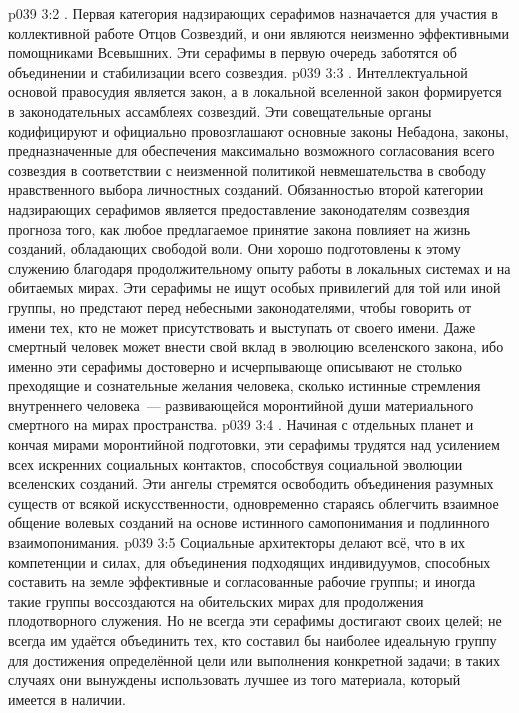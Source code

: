\vs p039 3:2 . Первая категория надзирающих серафимов назначается для участия в коллективной работе Отцов Созвездий, и они являются неизменно эффективными помощниками Всевышних. Эти серафимы в первую очередь заботятся об объединении и стабилизации всего созвездия.
\vs p039 3:3 . Интеллектуальной основой правосудия является закон, а в локальной вселенной закон формируется в законодательных ассамблеях созвездий. Эти совещательные органы кодифицируют и официально провозглашают основные законы Небадона, законы, предназначенные для обеспечения максимально возможного согласования всего созвездия в соответствии с неизменной политикой невмешательства в свободу нравственного выбора личностных созданий. Обязанностью второй категории надзирающих серафимов является предоставление законодателям созвездия прогноза того, как любое предлагаемое принятие закона повлияет на жизнь созданий, обладающих свободой воли. Они хорошо подготовлены к этому служению благодаря продолжительному опыту работы в локальных системах и на обитаемых мирах. Эти серафимы не ищут особых привилегий для той или иной группы, но предстают перед небесными законодателями, чтобы говорить от имени тех, кто не может присутствовать и выступать от своего имени. Даже смертный человек может внести свой вклад в эволюцию вселенского закона, ибо именно эти серафимы достоверно и исчерпывающе описывают не столько преходящие и сознательные желания человека, сколько истинные стремления внутреннего человека~--- развивающейся моронтийной души материального смертного на мирах пространства.
\vs p039 3:4 . Начиная с отдельных планет и кончая мирами моронтийной подготовки, эти серафимы трудятся над усилением всех искренних социальных контактов, способствуя социальной эволюции вселенских созданий. Эти ангелы стремятся освободить объединения разумных существ от всякой искусственности, одновременно стараясь облегчить взаимное общение волевых созданий на основе истинного самопонимания и подлинного взаимопонимания.
\vs p039 3:5 Социальные архитекторы делают всё, что в их компетенции и силах, для объединения подходящих индивидуумов, способных составить на земле эффективные и согласованные рабочие группы; и иногда такие группы воссоздаются на обительских мирах для продолжения плодотворного служения. Но не всегда эти серафимы достигают своих целей; не всегда им удаётся объединить тех, кто составил бы наиболее идеальную группу для достижения определённой цели или выполнения конкретной задачи; в таких случаях они вынуждены использовать лучшее из того материала, который имеется в наличии.
